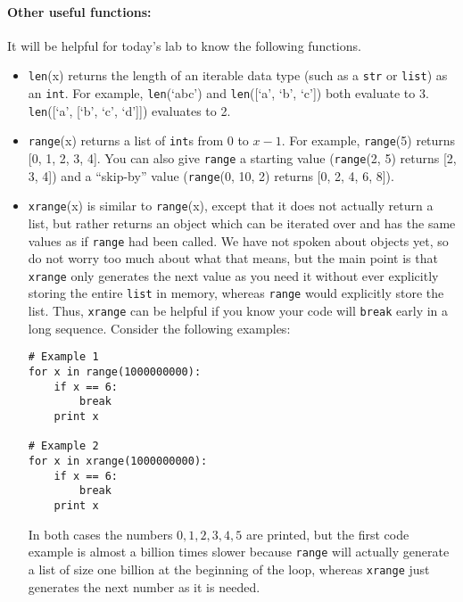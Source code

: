 \documentclass[11pt]{article}
\begin{document}
\paragraph{\Large Other useful functions:}
It will be helpful for today's lab to know the following functions.

\begin{itemize}
\item \texttt{len}(x) returns the length of an iterable data type
  (such as a \texttt{str} or \texttt{list}) as an \texttt{int}.  For
  example, \texttt{len}(`abc') and \texttt{len}([`a', `b', `c']) 
  both evaluate to 3.  \texttt{len}([`a', [`b', `c', `d']]) 
  evaluates to 2.
\item \texttt{range}(x) returns a list of \texttt{int}s from $0$ to
  $x-1$.  For example, \texttt{range}(5) returns [0, 1, 2, 3, 4].  You
  can also give \texttt{range} a starting value (\texttt{range}(2, 5)
  returns [2, 3, 4]) and a ``skip-by'' value (\texttt{range}(0, 10, 2)
  returns [0, 2, 4, 6, 8]).
\item \texttt{xrange}(x) is similar to \texttt{range}(x), except that
  it does not actually return a list, but rather returns an object
  which can be iterated over and has the same values as if
  \texttt{range} had been called.  We have not spoken about objects
  yet, so do not worry too much about what that means, but the main
  point is that \texttt{xrange} only generates the next value as you
  need it without ever explicitly storing the entire \texttt{list} in
  memory, whereas \texttt{range} would explicitly store the list.
  Thus, \texttt{xrange} can be helpful if you know your code will
  \texttt{break} early in a long sequence.  Consider the following
  examples:

\begin{verbatim}
# Example 1
for x in range(1000000000):
    if x == 6:
        break
    print x

# Example 2
for x in xrange(1000000000):
    if x == 6:
        break
    print x
\end{verbatim}

In both cases the numbers $0,1,2,3,4,5$ are printed, but the first
code example is almost a billion times slower because \texttt{range}
will actually generate a list of size one billion at the beginning of
the loop, whereas \texttt{xrange} just generates the next number as
it is needed.
\end{itemize}
\end{document}
